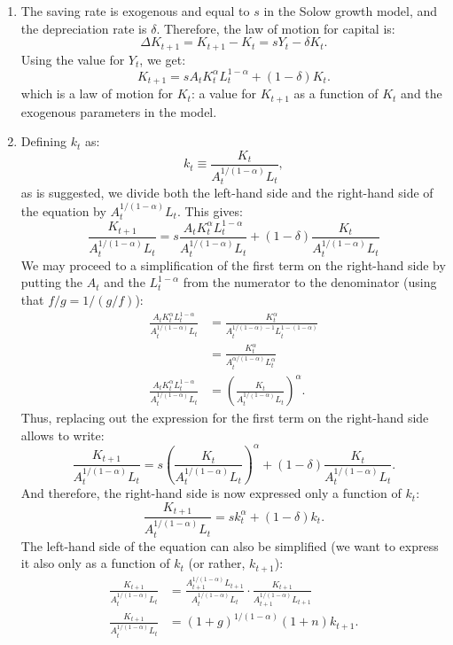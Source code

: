 \documentclass[]{book}
\begin{document}
\begin{enumerate}
\def\labelenumi{\arabic{enumi}.}
\item
  The saving rate is exogenous and equal to \(s\) in the Solow growth
  model, and the depreciation rate is \(\delta\). Therefore, the law of
  motion for capital is: \[\Delta K_{t+1}=K_{t+1}-K_t=sY_t-\delta K_t.\]
  Using the value for \(Y_t\), we get:
  \[\boxed{K_{t+1}=s A_t K_t^{\alpha} L_t^{1-\alpha} + (1-\delta) K_t}.\]
  which is a law of motion for \(K_t\): a value for \(K_{t+1}\) as a
  function of \(K_t\) and the exogenous parameters in the model.
\item
  Defining \(k_t\) as: \[k_t\equiv\frac{K_t}{A_t^{1/(1-\alpha)} L_t},\]
  as is suggested, we divide both the left-hand side and the right-hand
  side of the equation by \(A_t^{1/(1-\alpha)} L_t\). This gives:
  \[\frac{K_{t+1}}{A_t^{1/(1-\alpha)} L_t}=s \frac{A_t K_t^{\alpha} L_t^{1-\alpha}}{A_t^{1/(1-\alpha)} L_t} + (1-\delta) \frac{K_t}{A_t^{1/(1-\alpha)} L_t}\]
  We may proceed to a simplification of the first term on the right-hand
  side by putting the \(A_t\) and the \(L_t^{1-\alpha}\) from the
  numerator to the denominator (using that \(f/g=1/(g/f)\)): \[
  \begin{aligned}
  \frac{A_t K_t^{\alpha} L_t^{1-\alpha}}{A_t^{1/(1-\alpha)} L_t}&=\frac{K_t^\alpha}{A_t^{1/(1-\alpha)-1}L_t^{1-(1-\alpha)}}\\
  &=\frac{K_t^\alpha}{A_t^{\alpha/(1-\alpha)}L_t^{\alpha}}\\
  \frac{A_t K_t^{\alpha} L_t^{1-\alpha}}{A_t^{1/(1-\alpha)} L_t}&=\left(\frac{K_t}{A_t^{1/(1-\alpha)}L_t}\right)^\alpha.
  \end{aligned}
  \] Thus, replacing out the expression for the first term on the
  right-hand side allows to write:
  \[\frac{K_{t+1}}{A_t^{1/(1-\alpha)} L_t}=s\left(\frac{K_t}{A_t^{1/(1-\alpha)}L_t}\right)^\alpha+(1-\delta)\frac{K_t}{A_t^{1/(1-\alpha)} L_t}.\]
  And therefore, the right-hand side is now expressed only a function of
  \(k_t\):
  \[\frac{K_{t+1}}{A_t^{1/(1-\alpha)} L_t}=sk_t^\alpha+(1-\delta)k_t.\]
  The left-hand side of the equation can also be simplified (we want to
  express it also only as a function of \(k_t\) (or rather,
  \(k_{t+1}\)): \[
  \begin{aligned}
  \frac{K_{t+1}}{A_t^{1/(1-\alpha)} L_t}&= \frac{A_{t+1}^{1/(1-\alpha)} L_{t+1}}{A_t^{1/(1-\alpha)} L_t} \cdot \frac{K_{t+1}}{A_{t+1}^{1/(1-\alpha)} L_{t+1}} \\
  \frac{K_{t+1}}{A_t^{1/(1-\alpha)} L_t}&=(1+g)^{1/(1-\alpha)}(1+n) k_{t+1}.

\end{aligned}\]
\end{enumerate}
\end{document}
